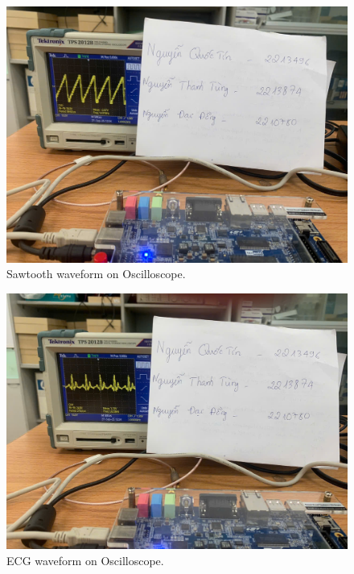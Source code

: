 \begin{figure}[H]
	\centering
	\includegraphics[width=.9\linewidth]{./my-chapters/my-images/Gen_wave/hinh4.jpg}
	\caption{Sawtooth waveform on Oscilloscope.}
\end{figure}

\begin{figure}[H]
	\centering
	\includegraphics[width=.9\linewidth]{./my-chapters/my-images/Gen_wave/hinh3.jpg}
	\caption{ECG waveform on Oscilloscope.}
\end{figure}